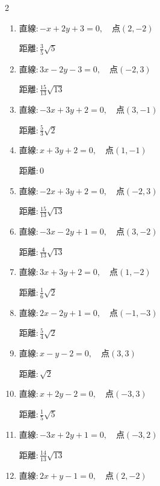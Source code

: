 \begin{multicols}{2}
\begin{enumerate}
  \item $直線:-x+2y+3=0,\quad 点 ( 2, -2 )$

        $\displaystyle 距離 : \frac{3}{5}\sqrt{5}$

  \item $直線:3x-2y-3=0,\quad 点 ( -2, 3 )$

        $\displaystyle 距離 : \frac{15}{13}\sqrt{13}$

  \item $直線:-3x+3y+2=0,\quad 点 ( 3, -1 )$

        $\displaystyle 距離 : \frac{5}{3}\sqrt{2}$

  \item $直線:x+3y+2=0,\quad 点 ( 1, -1 )$

        $\displaystyle 距離 : 0$

  \item $直線:-2x+3y+2=0,\quad 点 ( -2, 3 )$

        $\displaystyle 距離 : \frac{15}{13}\sqrt{13}$

  \item $直線:-3x-2y+1=0,\quad 点 ( 3, -2 )$

        $\displaystyle 距離 : \frac{4}{13}\sqrt{13}$

  \item $直線:3x+3y+2=0,\quad 点 ( 1, -2 )$

        $\displaystyle 距離 : \frac{1}{6}\sqrt{2}$

\columnbreak %

\resetques

  \item $直線:2x-2y+1=0,\quad 点 ( -1, -3 )$

        $\displaystyle 距離 : \frac{5}{4}\sqrt{2}$

  \item $直線:x-y-2=0,\quad 点 ( 3, 3 )$

        $\displaystyle 距離 : \sqrt{2}$

  \item $直線:x+2y-2=0,\quad 点 ( -3, 3 )$

        $\displaystyle 距離 : \frac{1}{5}\sqrt{5}$

  \item $直線:-3x+2y+1=0,\quad 点 ( -3, 2 )$

        $\displaystyle 距離 : \frac{14}{13}\sqrt{13}$

  \item $直線:2x+y-1=0,\quad 点 ( 2, -2 )$


\end{enumerate}
\end{multicols}
